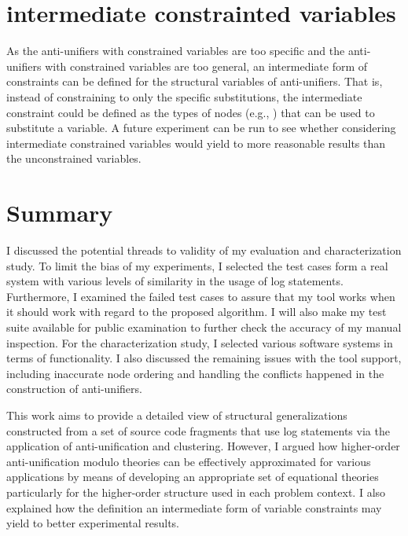 \section{intermediate constrainted variables}  \label{intC}

As the anti-unifiers with constrained variables are too specific and the anti-unifiers with constrained variables are too general, an intermediate form of constraints can be defined for the structural variables of anti-unifiers. That is, instead of constraining to only the specific substitutions, the intermediate constraint could be defined as the types of nodes (e.g.,  ) that can be used to substitute a variable. A future experiment can be run to see whether considering intermediate constrained variables would yield to more reasonable results than the unconstrained variables. 


\section{Summary}  \label{diss-summary}
I discussed the potential threads to validity of my evaluation and characterization study. To limit the bias of my experiments, I selected the test cases form a real system with various levels of similarity in the usage of log statements. Furthermore, I examined the failed test cases to assure that my tool works when it should work with regard to the proposed algorithm. I will also make my test suite available for public examination to further check the accuracy of my manual inspection. For the characterization study, I selected various software systems in terms of functionality. I also discussed the remaining issues with the tool support, including inaccurate node ordering and handling the conflicts happened in the construction of anti-unifiers.

This work aims to provide a detailed view of structural generalizations constructed from a set of source code fragments that use log statements via the application of anti-unification and clustering. However, I argued how higher-order anti-unification modulo theories can be effectively approximated for various applications by means of developing an appropriate set of equational theories particularly for the higher-order structure used in each problem context. I also explained how the definition an intermediate form of variable constraints may yield to better experimental results.


